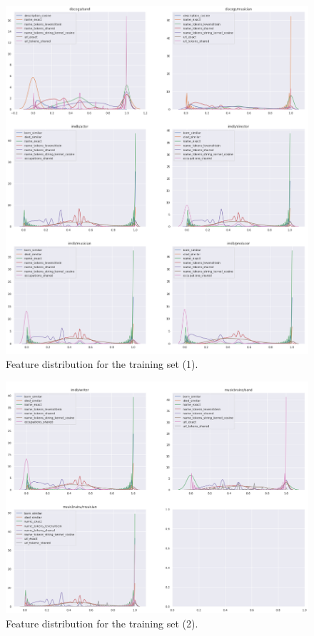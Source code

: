 \documentclass[epsfig,a4paper,11pt,titlepage,twoside,openany]{book}
\begin{document}
\begin{figure}[H]
      \centering
      \includegraphics[width=\linewidth]{training_feature_distribution}
      \caption{Feature distribution for the training set (1).}
      \label{fig:distribution-of-training-features-1}
\end{figure}

\begin{figure}[H]
      \centering
      \includegraphics[width=\linewidth]{training_feature_distribution_2}
      \caption{Feature distribution for the training set (2).}
      \label{fig:distribution-of-training-features-2}
\end{figure}
\end{document}
